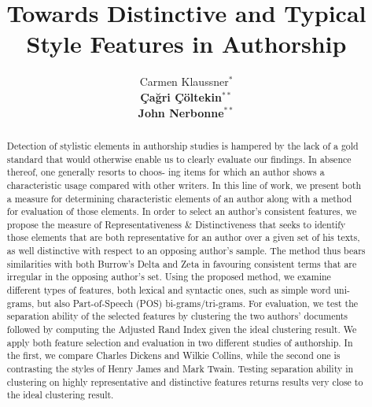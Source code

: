 \documentclass[a4paper,10pt,twoside,fleqn]{article}
\begin{document}
\title{Towards Distinctive and Typical Style Features in Authorship}


\author{Carmen Klaussner$^*$ \\
{\normalsize \bf \c{C}a\u{g}ri \c{C}öltekin}$^{**}$ \\
{\normalsize \bf John Nerbonne}$^{**}$ 
\AND {}
\AND {} }


\maketitle\thispagestyle{empty} %


\begin{abstract}
Detection of stylistic elements in authorship studies is hampered by
the lack of a gold standard that would otherwise enable us to clearly
evaluate our findings. In absence thereof, one generally resorts to choos-
ing items for which an author shows a characteristic usage compared
with other writers. In this line of work, we present both a measure for
determining characteristic elements of an author along with a method
for evaluation of those elements.
In order to select an author’s consistent features, we propose the
measure of Representativeness \& Distinctiveness \cite{prokic2012detecting} that
seeks to identify those elements that are both representative for an author
over a given set of his texts, as well distinctive with respect to an opposing
author’s sample. The method thus bears similarities with both Burrow’s
Delta \cite{Burrows2002delta} and Zeta \cite{Burrows2007all} in favouring consistent
terms that are irregular in the opposing author’s set.
Using the proposed method, we examine different types of features,
both lexical and syntactic ones, such as simple word uni-grams, but also
Part-of-Speech (POS) bi-grams/tri-grams. For evaluation, we test the
separation ability of the selected features by clustering the two authors’
documents followed by computing the Adjusted Rand Index \cite{hubert1985comparing} 
given the ideal clustering result.
We apply both feature selection and evaluation in two different
studies of authorship. In the first, we compare Charles Dickens and
Wilkie Collins, while the second one is contrasting the styles of Henry
James and Mark Twain. Testing separation ability in clustering on highly
representative and distinctive features returns results very close to the
ideal clustering result.
\end{abstract}
\end{document}
